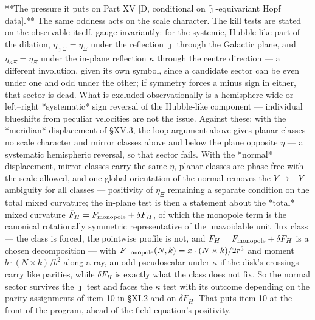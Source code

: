 **The pressure it puts on Part XV [D, conditional on $\widetilde\jmath$-equivariant Hopf data].** The same oddness acts on the scale character. The kill tests are stated on the observable itself, gauge-invariantly: for the systemic, Hubble-like part of the dilation, $\eta_{\jmath\Xi} = \eta_\Xi$ under the reflection $\jmath$ through the Galactic plane, and $\eta_{\kappa\Xi} = \eta_\Xi$ under the in-plane reflection $\kappa$ through the centre direction — a different involution, given its own symbol, since a candidate sector can be even under one and odd under the other; if symmetry forces a minus sign in either, that sector is dead. What is excluded observationally is a hemisphere-wide or left–right *systematic* sign reversal of the Hubble-like component — individual blueshifts from peculiar velocities are not the issue. Against these: with the *meridian* displacement of §XV.3, the loop argument above gives planar classes no scale character and mirror classes above and below the plane opposite $\eta$ — a systematic hemispheric reversal, so that sector fails. With the *normal* displacement, mirror classes carry the same $\eta$, planar classes are phase-free with the scale allowed, and one global orientation of the normal removes the $Y\to-Y$ ambiguity for all classes — positivity of $\eta_\Xi$ remaining a separate condition on the total mixed curvature; the in-plane test is then a statement about the *total* mixed curvature $\bar F_H = F_{\rm monopole}+\delta F_H$, of which the monopole term is the canonical rotationally symmetric representative of the unavoidable unit flux class — the class is forced, the pointwise profile is not, and $F_H = F_{\rm monopole}+\delta F_H$ is a chosen decomposition — with $F_{\rm monopole}(N,k) = x\cdot(N\times k)/2r^3$ and moment $b\cdot(N\times k)/b^2$ along a ray, an odd pseudoscalar under $\kappa$ if the disk's crossings carry like parities, while $\delta F_H$ is exactly what the class does not fix. So the normal sector survives the $\jmath$ test and faces the $\kappa$ test with its outcome depending on the parity assignments of item 10 in §XI.2 and on $\delta F_H$. That puts item 10 at the front of the program, ahead of the field equation's positivity.

